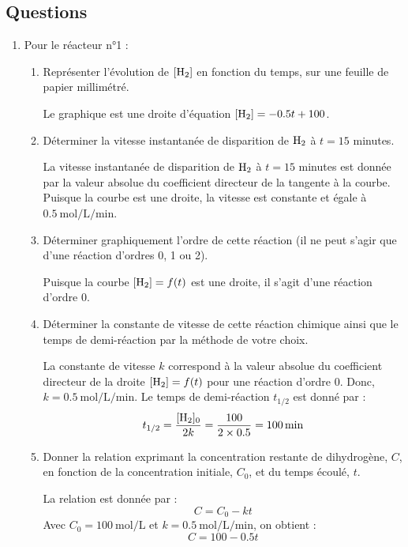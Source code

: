 \documentclass[12pt,a4paper]{article}
\newcommand{\correction}[1]{\textcolor{correction}{#1}}
\begin{document}
\subsection*{Questions}
\begin{enumerate}
    \item Pour le réacteur n°1 :
    \begin{enumerate}
        \item Représenter l'évolution de $[\ce{H2}]$ en fonction du temps, sur une feuille de papier millimétré.

        \correction{
            Le graphique est une droite d'équation $[\ce{H2}] = -0.5t + 100$.
        }

        \item Déterminer la vitesse instantanée de disparition de $\ce{H2}$ à $t = 15$ minutes.

        \correction{
            La vitesse instantanée de disparition de $\ce{H2}$ à $t = 15$ minutes est donnée par la valeur absolue du coefficient directeur de la tangente à la courbe. Puisque la courbe est une droite, la vitesse est constante et égale à $\SI{0.5}{\mole\per\liter\per\minute}$.
        }

        \item Déterminer graphiquement l'ordre de cette réaction (il ne peut s'agir que d'une réaction d'ordres 0, 1 ou 2).

        \correction{
            Puisque la courbe $[\ce{H2}] = f(t)$ est une droite, il s'agit d'une réaction d'ordre 0.
        }

        \item Déterminer la constante de vitesse de cette réaction chimique ainsi que le temps de demi-réaction par la méthode de votre choix.

        \correction{
            La constante de vitesse $k$ correspond à la valeur absolue du coefficient directeur de la droite $[\ce{H2}] = f(t)$ pour une réaction d'ordre 0. Donc, $k = \SI{0.5}{\mole\per\liter\per\minute}$.
            Le temps de demi-réaction $t_{1/2}$ est donné par :
            \[
            t_{1/2} = \frac{[\ce{H2}]_0}{2k} = \frac{100}{2 \times 0.5} = \SI{100}{\minute}
            \]
        }

        \item Donner la relation exprimant la concentration restante de dihydrogène, $C$, en fonction de la concentration initiale, $C_0$, et du temps écoulé, $t$.

        \correction{
            La relation est donnée par :
            \[
            C = C_0 - kt
            \]
            Avec $C_0 = \SI{100}{\mole\per\liter}$ et $k = \SI{0.5}{\mole\per\liter\per\minute}$, on obtient :
            \[
            C = 100 - 0.5t
            \]
        }
    \end{enumerate}


\end{enumerate}
\end{document}
